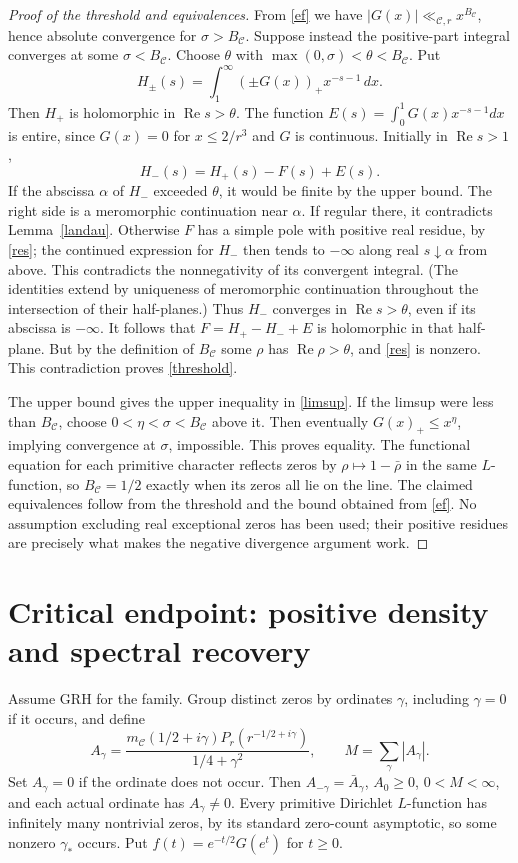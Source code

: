 \documentclass[11pt]{article}
\theoremstyle{remark}\newtheorem{remark}[theorem]{Remark}
\newcommand{\Rea}{\operatorname{Re}}
\newcommand{\C}{\mathcal C}
\begin{document}
\begin{proof}[Proof of the threshold and equivalences]
From \eqref{ef} we have $|G(x)|\ll_{\C,r}x^{B_\C}$, hence absolute convergence for $\sigma>B_\C$. Suppose instead the positive-part integral converges at some $\sigma<B_\C$. Choose $\theta$ with $\max(0,\sigma)<\theta<B_\C$. Put
\[
 H_\pm(s)=\int_1^\infty (\pm G(x))_+ x^{-s-1}\,dx.
\]
Then $H_+$ is holomorphic in $\Rea s>\theta$. The function $E(s)=\int_0^1G(x)x^{-s-1}dx$ is entire, since $G(x)=0$ for $x\le2/r^3$ and $G$ is continuous. Initially in $\Rea s>1$,
\[
 H_-(s)=H_+(s)-F(s)+E(s).
\]
If the abscissa $\alpha$ of $H_-$ exceeded $\theta$, it would be finite by the upper bound. The right side is a meromorphic continuation near $\alpha$. If regular there, it contradicts Lemma~\ref{landau}. Otherwise $F$ has a simple pole with positive real residue, by \eqref{res}; the continued expression for $H_-$ then tends to $-\infty$ along real $s\downarrow\alpha$ from above. This contradicts the nonnegativity of its convergent integral. (The identities extend by uniqueness of meromorphic continuation throughout the intersection of their half-planes.) Thus $H_-$ converges in $\Rea s>\theta$, even if its abscissa is $-\infty$. It follows that $F=H_+-H_-+E$ is holomorphic in that half-plane. But by the definition of $B_\C$ some $\rho$ has $\Rea\rho>\theta$, and \eqref{res} is nonzero. This contradiction proves \eqref{threshold}.

The upper bound gives the upper inequality in \eqref{limsup}. If the limsup were less than $B_\C$, choose $0<\eta<\sigma<B_\C$ above it. Then eventually $G(x)_+\le x^\eta$, implying convergence at $\sigma$, impossible. This proves equality. The functional equation for each primitive character reflects zeros by $\rho\mapsto1-\bar\rho$ in the same $L$-function, so $B_\C=1/2$ exactly when its zeros all lie on the line. The claimed equivalences follow from the threshold and the bound obtained from \eqref{ef}. No assumption excluding real exceptional zeros has been used; their positive residues are precisely what makes the negative divergence argument work.
\end{proof}

\section{Critical endpoint: positive density and spectral recovery}
Assume GRH for the family. Group distinct zeros by ordinates $\gamma$, including $\gamma=0$ if it occurs, and define
\begin{equation}\label{A}
 A_\gamma=\frac{m_\C(1/2+i\gamma)P_r(r^{-1/2+i\gamma})}{1/4+\gamma^2},\qquad M=\sum_\gamma|A_\gamma|.
\end{equation}
Set $A_\gamma=0$ if the ordinate does not occur. Then $A_{-\gamma}=\bar A_\gamma$, $A_0\ge0$, $0<M<\infty$, and each actual ordinate has $A_\gamma\ne0$. Every primitive Dirichlet $L$-function has infinitely many nontrivial zeros, by its standard zero-count asymptotic, so some nonzero $\gamma_*$ occurs. Put $f(t)=e^{-t/2}G(e^t)$ for $t\ge0$.
\end{document}
